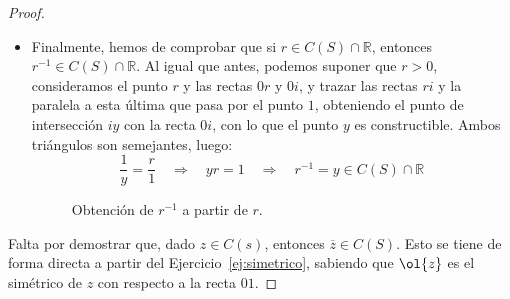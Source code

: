 \begin{prop}
\begin{proof}
\begin{itemize}
    \item Finalmente, hemos de comprobar que si $r\in C(S)\cap \mathbb{R}$, entonces $r^{-1}\in C(S)\cap \mathbb{R}$. Al igual que antes, podemos suponer que $r>0$, consideramos el punto $r$ y las rectas $0r$ y $0i$, y trazar las rectas $ri$ y la paralela a esta última que pasa por el punto $1$, obteniendo el punto de intersección $iy$ con la recta $0i$, con lo que el punto $y$ es constructible. Ambos triángulos son semejantes, luego:
        \begin{equation*}
            \dfrac{1}{y} = \dfrac{r}{1} \quad \Longrightarrow \quad  yr = 1 \quad \Longrightarrow\quad  r^{-1} = y\in C(S)\cap \mathbb{R}
        \end{equation*}
        \begin{figure}[h]
            \centering
            \caption{Obtención de $r^{-1}$ a partir de $r$.}
            \label{fig:inverso_reales}
        \end{figure}
    \end{itemize}

    Falta por demostrar que, dado $z\in C(s)$, entonces $\overline{z}\in C(S)$. Esto se tiene de forma directa a partir del Ejercicio~\ref{ej:simetrico}, sabiendo que $\ol{z}$ es el simétrico de $z$ con respecto a la recta $01$.
    \end{proof}
\end{prop}


